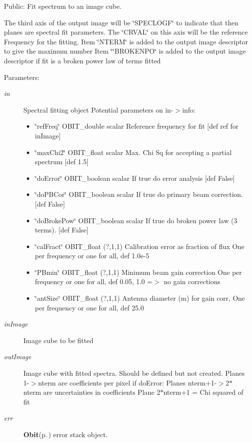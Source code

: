 Public: Fit spectrum to an image cube. 

The third axis of the output image will be \char`\"{}SPECLOGF\char`\"{} to indicate that then planes are spectral fit parameters. The \char`\"{}CRVAL\char`\"{} on this axis will be the reference Frequency for the fitting. Item \char`\"{}NTERM\char`\"{} is added to the output image descriptor to give the maximum number Item \char`\"{}\char`\"{}BROKENPO\char`\"{} is added to the output image descriptor if fit is a broken power law of terms fitted \begin{Desc}
\item[Parameters:]
\begin{description}
\item[{\em in}]Spectral fitting object Potential parameters on in-$>$info: \begin{itemize}
\item \char`\"{}ref\-Freq\char`\"{} OBIT\_\-double scalar Reference frequency for fit [def ref for in\-Image] \item \char`\"{}max\-Chi2\char`\"{} OBIT\_\-float scalar Max. Chi Sq for accepting a partial spectrum [def 1.5] \item \char`\"{}do\-Error\char`\"{} OBIT\_\-boolean scalar If true do error analysis [def False] \item \char`\"{}do\-PBCor\char`\"{} OBIT\_\-boolean scalar If true do primary beam correction. [def False] \item \char`\"{}do\-Broke\-Pow\char`\"{} OBIT\_\-boolean scalar If true do broken power law (3 terms). [def False] \item \char`\"{}cal\-Fract\char`\"{} OBIT\_\-float (?,1,1) Calibration error as fraction of flux One per frequency or one for all, def 1.0e-5 \item \char`\"{}PBmin\char`\"{} OBIT\_\-float (?,1,1) Minimum beam gain correction One per frequency or one for all, def 0.05, 1.0 =$>$ no gain corrections \item \char`\"{}ant\-Size\char`\"{} OBIT\_\-float (?,1,1) Antenna diameter (m) for gain corr, One per frequency or one for all, def 25.0\end{itemize}
\item[{\em in\-Image}]Image cube to be fitted \item[{\em out\-Image}]Image cube with fitted spectra. Should be defined but not created. Planes 1-$>$nterm are coefficients per pixel if do\-Error: Planes nterm+1-$>$2$\ast$nterm are uncertainties in coefficients Plane 2$\ast$nterm+1 = Chi squared of fit \item[{\em err}]{\bf Obit}{\rm (p.\,\pageref{structObit})} error stack object. \end{description}
\end{Desc}
